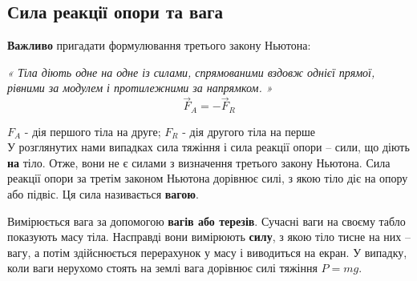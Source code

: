 \documentclass[a4paper,12pt]{article}
\begin{document}
\subsection{Сила реакції опори та вага}
\textcolor{EdErablue}{\textbf{Важливо}} пригадати формулювання третього закону Ньютона: \begin{center}
\textit{« Тіла діють одне на одне із силами, спрямованими вздовж однієї прямої, рівними за модулем і протилежними за напрямком. »} $$\boxed{\vec{F}_A = - \vec{F}_R}$$
\end{center}
$F_A$ - дія першого тіла на друге; $F_R$ - дія другого тіла на перше\\

У розглянутих нами випадках сила тяжіння і сила реакції опори – сили, що діють \textbf{на} тіло. Отже, вони не є силами з визначення третього закону Ньютона. Сила реакції опори за третім законом Ньютона дорівнює силі, з якою тіло діє на опору або підвіс. Ця сила називається \textcolor{EdErablue}{\textbf{вагою}}.


\hspace{-0.8cm} Вимірюється вага за допомогою \textcolor{EdErablue}{\textbf{вагів або терезів}}. Сучасні ваги на своєму табло показують масу тіла. Насправді вони вимірюють \textbf{силу}, з якою тіло тисне на них – вагу, а потім здійснюється перерахунок у масу і виводиться на екран. У випадку, коли ваги нерухомо стоять на землі вага дорівнює силі тяжіння $P = mg$.\\
\newline
{}
\end{document}
